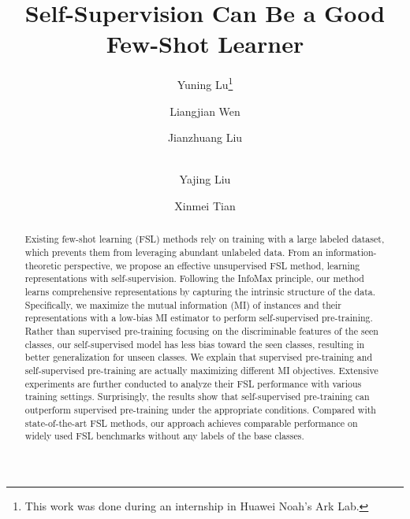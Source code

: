 \documentclass[runningheads]{llncs}
\begin{document}
\pagestyle{headings}
\mainmatter
\def\ECCVSubNumber{1882}  

\title{Self-Supervision Can Be a Good \\ Few-Shot Learner} 



\author{Yuning Lu\thanks{This work was done during an internship in Huawei Noah's Ark Lab.} \and Liangjian Wen \and Jianzhuang Liu \and \\Yajing Liu \and Xinmei Tian}


\maketitle

\begin{abstract}
Existing few-shot learning (FSL) methods rely on training with a large labeled dataset, which prevents them from leveraging abundant unlabeled data. 
From an information-theoretic perspective, we propose an effective unsupervised FSL method, learning representations with self-supervision. 
Following the InfoMax principle, our method learns comprehensive representations by capturing the intrinsic structure of the data. 
Specifically, we maximize the mutual information (MI) of instances and their representations with a low-bias MI estimator to perform self-supervised pre-training. 
Rather than supervised pre-training focusing on the discriminable features of the seen classes, our self-supervised model has less bias toward the seen classes, resulting in better generalization for unseen classes. 
We explain that supervised pre-training and self-supervised pre-training are actually maximizing different MI objectives. 
Extensive experiments are further conducted to analyze their FSL performance with various training settings. 
Surprisingly, the results show that self-supervised pre-training can outperform supervised pre-training under the appropriate conditions. 
Compared with state-of-the-art FSL methods, our approach achieves comparable performance on widely used FSL benchmarks without any labels of the base classes.

\end{abstract}
\end{document}
